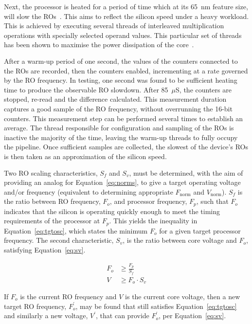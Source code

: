 \documentclass[a4paper,twocolumn,DIV=16]{scrartcl}
\begin{document}
Next, the processor is heated for a period of time which at its 65~nm feature
size, will slow the ROs~\cite{cmosTempInversion}. This aims to reflect the
silicon speed under a heavy workload. This is achieved by executing several
threads of interleaved multiplication operations with specially selected operand
values. This particular set of threads has been shown to maximise the power
dissipation of the core~\cite{Kerrison2013}.

After a warm-up period of one second, the values of the counters connected to
the ROs are recorded, then the counters enabled, incrementing at a rate governed
by the RO frequency. In testing, one second was found to be sufficient heating
time to produce the observable RO slowdown. After 85~$\mu$S, the counters are
stopped, re-read and the difference calculated. This measurement duration
captures a good sample of the RO frequency, without overrunning the 16-bit
counters.  This measurement step can be performed several times to establish an
average.  The thread responsible for configuration and sampling of the ROs is
inactive the majority of the time, leaving the warm-up threads to fully occupy
the pipeline.  Once sufficient samples are collected, the slowest of the
device's ROs is then taken as an approximation of the silicon speed.

Two RO scaling characteristics, $S_f$ and $S_v$, must be determined, with the
aim of providing an analog for Equation~\ref{eq:norms}, to give a target
operating voltage and/or frequency (equivalent to determining appropriate
$F_\text{norm}$ and $V_\text{norm}$). $S_f$ is the ratio between RO frequency,
$F_o$, and processor frequency, $F_p$, such that $F_o$ indicates that the
silicon is operating quickly enough to meet the timing requirements of the
processor at $F_p$. This yields the inequality in Equation~\ref{eq:tgtosc},
which states the minimum $F_o$ for a given target processor frequency. The
second characteristic, $S_v$, is the ratio between core voltage and $F_o$,
satisfying Equation~\ref{eq:sv}.

\begin{align}
F_o &\ge \frac{F_p}{S_f}
\label{eq:tgtosc}
\\
V &\ge F_o \cdot S_v
\label{eq:sv}
\end{align}

If $F_o$ is the current RO frequency and $V$ is the current core voltage, then a
new target RO frequency, $F_o^\prime$, may be found that still satisfies
Equation~\ref{eq:tgtosc} and similarly a new voltage, $V^\prime$, that can
provide $F_o^\prime$, per Equation~\ref{eq:sv}.
\end{document}
